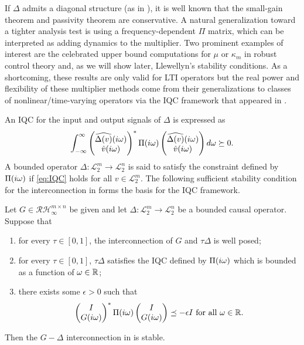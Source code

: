 If $\Delta$ admits a diagonal structure (as in ), it is well known that the small-gain theorem 
and passivity theorem are conservative. A natural generalization toward a tighter analysis test is using a frequency-dependent 
$\Pi$ matrix, {which can be interpreted as} adding dynamics to the multiplier. Two prominent examples of 
interest are the celebrated upper bound computations for $\mu$ or $\kappa_m$ in robust control theory and, as we will 
show later, Llewellyn's stability conditions. As a shortcoming, these results are only valid for LTI operators but the 
real power and flexibility of these multiplier methods come from {their} generalizations to classes of nonlinear/time-varying 
operators via the IQC framework that appeared in \cite{megretski}.

An IQC for the input and output signals of $\Delta$ is expressed as
\begin{equation}{\int_{-\infty}^\infty{\begin{pmatrix}\widehat{\Delta(v)}(i\omega)\\\hat{v}(i\omega)\end{pmatrix}^*\Pi(i\omega)\begin{pmatrix}\widehat{\Delta(v)}(i\omega)\\\hat{v}(i\omega)\end{pmatrix}d\omega}} \succeq 0.
\label{eq:IQC}
\end{equation}
A bounded operator $\Delta:\mathcal{L}^m_2\to\mathcal{L}^n_2$ is said to satisfy the constraint defined by $\Pi(i\omega)$ 
if \eqref{eq:IQC} holds for all $v\in\mathcal{L}^m_2$. The following sufficient {stability condition for the interconnection 
in } forms the basis for the IQC framework. 


\begin{thm}\label{IQCthm} Let $G\in\mathcal{RH}^{m\times n}_\infty$ be given and 
let $\Delta:\mathcal{L}^m_2\to\mathcal{L}^n_2$ be a bounded causal operator. Suppose that
\begin{enumerate}
	\item for every $\tau\in[0,1]$, the interconnection of $G$ and $\tau\Delta$ is well posed;
	\item for every $\tau\in[0,1]$, $\tau\Delta$ satisfies the IQC 
    defined by $\Pi(i\omega)$ which is bounded as a function of $\omega\in\mathbb{R}$;
	\item there exists some $\epsilon>0$ such that
	\begin{equation}
	\begin{pmatrix}I\\G(i\omega)\end{pmatrix}^*\Pi(i\omega)\begin{pmatrix}I\\G(i\omega)\end{pmatrix} \preceq -\epsilon I\text{\ for all\ }\omega\in\mathbb{\mathbb{R}}.
	\label{eq:IQCthmFDI}
	\end{equation}
\end{enumerate}
Then the $G-\Delta$ interconnection {in }  is stable.
\end{thm}


